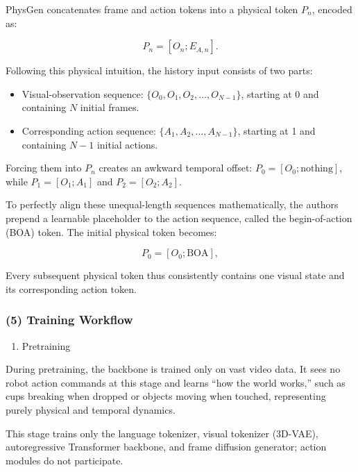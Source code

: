 PhysGen concatenates frame and action tokens into a physical token \(P_n\), encoded as:

\[
P_n=[O_n;E_{A,n}].
\]

Following this physical intuition, the history input consists of two parts:

\begin{itemize}
\tightlist
\item
  Visual-observation sequence: \(\lbrace O_0,O_1,O_2,\ldots,O_{N-1}\rbrace\), starting at 0 and containing \(N\) initial frames.
\item
  Corresponding action sequence: \(\lbrace A_1,A_2,\ldots,A_{N-1}\rbrace\), starting at 1 and containing \(N-1\) initial actions.
\end{itemize}

Forcing them into \(P_n\) creates an awkward temporal offset: \(P_0=[O_0;\text{nothing}]\), while \(P_1=[O_1;A_1]\) and \(P_2=[O_2;A_2]\).

To perfectly align these unequal-length sequences mathematically, the authors prepend a learnable placeholder to the action sequence, called the begin-of-action (BOA) token. The initial physical token becomes:

\[
P_0=[O_0;\mathrm{BOA}],
\]

Every subsequent physical token thus consistently contains one visual state and its corresponding action token.

\hypertarget{training-workflow-2}{%
\subsubsection{(5) Training Workflow}\label{training-workflow-2}}

\begin{enumerate}
\def\labelenumi{\arabic{enumi}.}
\tightlist
\item
  Pretraining
\end{enumerate}

During pretraining, the backbone is trained only on vast video data. It sees no robot action commands at this stage and learns ``how the world works,'' such as cups breaking when dropped or objects moving when touched, representing purely physical and temporal dynamics.

This stage trains only the language tokenizer, visual tokenizer (3D-VAE), autoregressive Transformer backbone, and frame diffusion generator; action modules do not participate.

